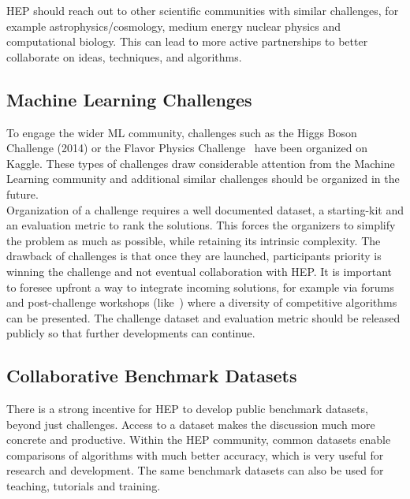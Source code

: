 HEP should reach out to other scientific communities with similar challenges, for example astrophysics/cosmology, medium energy nuclear physics and computational biology. This can lead to more active partnerships to better collaborate on ideas, techniques, and algorithms.


\subsection{Machine Learning Challenges}

To engage the wider ML community, challenges such as the Higgs Boson Challenge (2014) or the Flavor Physics Challenge~\cite{NIPS:2015:ALEPH,FlavourDataMining} have been organized on Kaggle.
These types of challenges draw considerable attention from the Machine Learning community and additional similar challenges should be organized in the future.\\

Organization of a challenge requires a well documented dataset, a starting-kit and an evaluation metric to rank the solutions.
This forces the organizers to simplify the problem as much as possible, while retaining its intrinsic complexity.
The drawback of challenges is that once they are launched, participants priority is winning the challenge and not eventual collaboration with HEP.
It is important to foresee upfront a way to integrate incoming solutions, for example via forums and post-challenge workshops (like~\cite{FlavourDataMining}) where a diversity of competitive algorithms can be presented.
The challenge dataset and evaluation metric should be released publicly so that further developments can continue.

\subsection{Collaborative Benchmark Datasets}\label{subsec:benchmark}
There is a strong incentive for HEP to develop public benchmark datasets, beyond just challenges. Access to a dataset makes the discussion much more concrete and productive. Within the HEP community, common datasets enable comparisons of algorithms with much better accuracy, which is very useful for research and development. The same benchmark datasets can also be used for teaching, tutorials and training.\\

